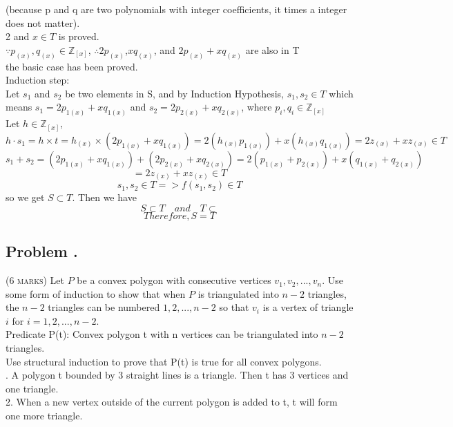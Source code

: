 \documentclass[12pt]{article}
\newcounter{ProblemNum}
\renewcommand{\theProblemNum}{\arabic{ProblemNum}}
\newcommand*{\anyproblem}[1]{\newpage\subsection*{#1}}
\newcommand*{\problem}[1]{\stepcounter{ProblemNum} %
\anyproblem{Problem \theProblemNum. \; #1}}
\begin{document}
\noindent
(because p and q are two polynomials with integer coefficients, it times a integer does not matter). \\

2 and $x \in T$ is proved.\\

$\because p_{(x)},q_{(x)} \in \mathbb{Z}_{[x]}$,
$\therefore 2p_{(x)}$,$xq_{(x)}$, and $2p_{(x)}+xq_{(x)}$ are also in T\\

the basic case has been proved.\\


Induction step:\\

Let $s_1$ and $s_2 $ be two elements in S, and by Induction Hypothesis, $s_1,s_2\in T$ which means $s_1=2p_{1(x)}+xq_{1(x)}$ and 
$s_2=2p_{2(x)}+xq_{2(x)}$, where $p_i,q_i \in \mathbb{Z}_{[x]}$\\

\noindent
Let $h\in \mathbb{Z}_{[x]}$,$h\cdot s_1= h\times t=
h_{(x)}
\times
(2p_{1(x)}+xq_{1(x)})
=2(h_{(x)}p_{1(x)})+
x(h_{(x)}q_{1(x)})=2z_(x)+xz_(x) \in T$\\

\noindent
$s_{1}+ s_{2}=
(2p_{1(x)}+xq_{1(x)})
+
(2p_{2(x)}+xq_{2(x)})
=2(p_{1(x)}+p_{2(x)})+
x(q_{1(x)}+q_{2(x)})$
\[=2z_{(x)}+xz_{(x)} \in T\]
\[s_1,s_2 \in T => f(s_1,s_2) \in T\]
so we get $S\subset T$.
Then we have
\[S\subset T \quad and \quad T\subset\]
\[Therefore,  S=T\]


\problem{}
\textsc{(6 marks)} Let $P$ be a convex polygon with consecutive vertices $v_1, v_2, ..., v_n$.
          Use some form of induction to show that when $P$ is triangulated into $n - 2$ triangles, 
          the $n - 2$ triangles can be numbered $1, 2, ..., n - 2$ so that $v_i$ is a vertex of 
          triangle $i$ for $i = 1, 2, ..., n-2$. \\


          Predicate P(t): Convex polygon t with n vertices can be triangulated into $n-2$ triangles.\\
          
          Use structural induction to prove that P(t) is true for all convex polygons.\\
          
          . A polygon t bounded by 3 straight lines is a triangle.
          Then t has 3 vertices and one triangle.\\
          2. When a new vertex outside of the current polygon is added to t, t will form one more triangle.\\
          
\end{document}

